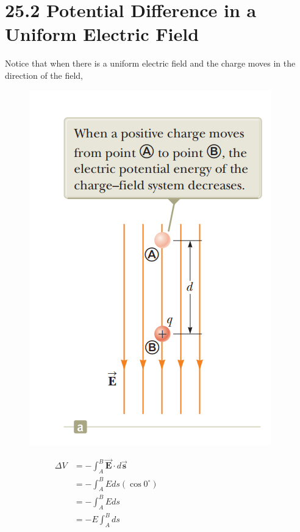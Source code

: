 \documentclass[12pt, titlepage, oneside]{article}
\let\oldvec\vec
\renewcommand{\vec}[1]{\oldvec{\bm{#1}}}
\begin{document}
\section*{25.2 Potential Difference in a Uniform Electric Field}
Notice that when there is a uniform electric field and the charge moves in the direction of the field, 

\begin{figure}
	\begin{center}
		\vspace{-1.6cm}
		\includegraphics[scale=0.8]{1.png}
	\end{center}
\end{figure} 
\begin{align*}
\Delta V &= -\int_A^B \vec{E} \cdot d\vec{s} \\
		 &= -\int_A^B E ds (\cos 0^{\circ}) \\
		 &= -\int_A^B Eds \\
		 &= -E \int_A^B ds\hspace{7cm}
\end{align*} 
\\
\end{document}
